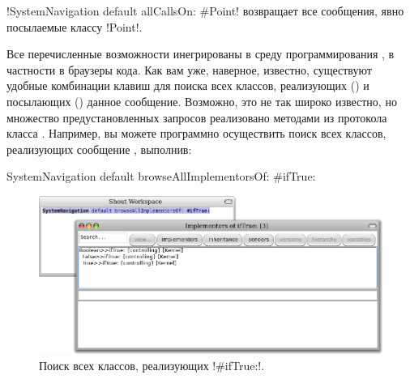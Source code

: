 \documentclass[a4paper,10pt,twoside]{book}
\begin{document}
\ct!SystemNavigation default allCallsOn: #Point! возвращает все сообщения, явно посылаемые классу \ct!Point!.

Все перечисленные возможности инегрированы в среду программирования \pharo, в частности в браузеры кода.
Как вам уже, наверное, известно, существуют удобные комбинации клавиш для поиска всех классов, реализующих () и посылающих () данное сообщение.
Возможно, это не так широко известно, но множество предустановленных запросов реализовано методами из протокола  класса .
Например, вы можете программно осуществить поиск всех классов, реализующих сообщение , выполнив:
\begin{code}{}
SystemNavigation default browseAllImplementorsOf: #ifTrue:
\end{code}

\begin{figure}[ht]\centering
	\includegraphics[width=\linewidth]{implementors}
	\caption{Поиск всех классов, реализующих \ct!\#ifTrue:!.}
\end{figure}
\end{document}
